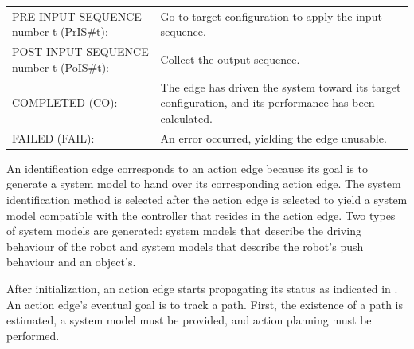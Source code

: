 \noindent
\begin{table}[H]
\centering
\begin{tabular}%
  {>{\raggedleft\arraybackslash}p{}%
   >{\raggedright\arraybackslash}p{}}
PRE INPUT SEQUENCE number t (PrIS\#t): & Go to target configuration to apply the input sequence. \\
POST INPUT SEQUENCE number t (PoIS\#t): & Collect the output sequence. \\
COMPLETED (CO): & The edge has driven the system toward its target configuration, and its performance has been calculated. \\
FAILED (FAIL): & An error occurred, yielding the edge unusable. \\
\end{tabular}
\end{table}

An identification edge corresponds to an action edge because its goal is to generate a system model to hand over its corresponding action edge. The system identification method is selected after the action edge is selected to yield a system model compatible with the controller that resides in the action edge. Two types of system models are generated: system models that describe the driving behaviour of the robot and system models that describe the robot's push behaviour and an object's.\bs

After initialization, an action edge starts propagating its status as indicated in . An action edge's eventual goal is to track a path. First, the existence of a path is estimated, a system model must be provided, and action planning must be performed. \bs

